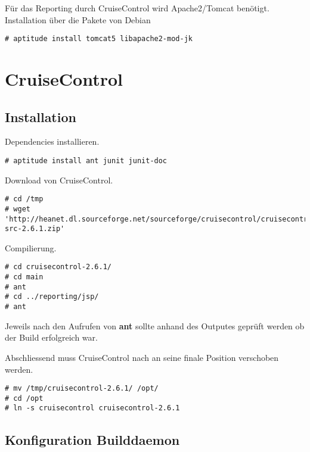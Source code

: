 \documentclass[12pt,halfparskip]{scrreprt}
\begin{document}
Für das Reporting durch CruiseControl wird Apache2/Tomcat benötigt. Installation über die Pakete von Debian

\begin{verbatim}
# aptitude install tomcat5 libapache2-mod-jk
\end{verbatim}


\section{CruiseControl} %
\label{sec:cruisecontrol}

\subsection{Installation} %
\label{sub:installation-cruisecontrol}

Dependencies installieren.

\begin{verbatim}
# aptitude install ant junit junit-doc
\end{verbatim}

Download von CruiseControl.

\begin{verbatim}
# cd /tmp
# wget 'http://heanet.dl.sourceforge.net/sourceforge/cruisecontrol/cruisecontrol-src-2.6.1.zip'
\end{verbatim}

Compilierung.

\begin{verbatim}
# cd cruisecontrol-2.6.1/
# cd main
# ant
# cd ../reporting/jsp/
# ant
\end{verbatim}

Jeweils nach den Aufrufen von \textbf{ant} sollte anhand des Outputes geprüft werden ob der Build erfolgreich war.

Abschliessend muss CruiseControl nach an seine finale Position verschoben werden.

\begin{verbatim}
# mv /tmp/cruisecontrol-2.6.1/ /opt/
# cd /opt
# ln -s cruisecontrol cruisecontrol-2.6.1
\end{verbatim}


\subsection{Konfiguration Builddaemon} %
\label{sub:konfiguration_builddaemon}
\end{document}
